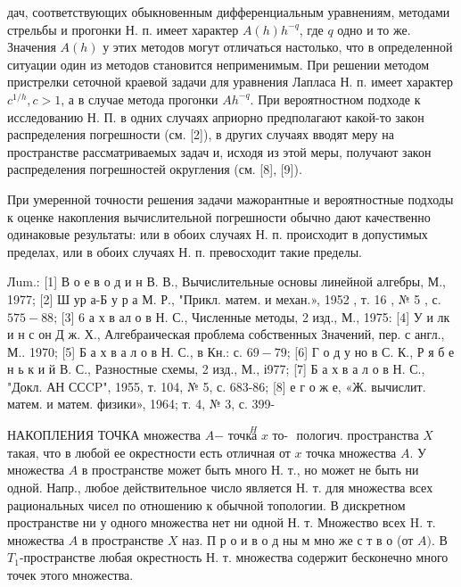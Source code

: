 \documentclass[10pt]{article}
\begin{document}
дач, соответствующих обыкновенным дифференциальным уравнениям, методами стрельбы и прогонки Н. п. имеет характер $A(h) h^{-q}$, где $q$ одно и то же. Значения $A(h)$ у этих методов могут отличаться настолько, что в определенной ситуации один из методов становится неприменимым. При решении методом пристрелки сеточной краевой задачи для уравнения Лапласа Н. п. имеет характер $c^{1 / h}, c>1$, а в случае метода прогонки $A h^{-q}$. При вероятностном подходе к исследованию Н. П. в одних случаях априорно предполагают какой-то закон распределения погрешности (см. [2]), в других случаях вводят меру на пространстве рассматриваемых задач и, исходя из этой меры, получают закон распределения погрешностей округления (см. [8], [9]).



При умеренной точности решения задачи мажорантные и вероятностные подходы к оценке накопления вычислительной погрешности обычно дают качественно одинаковые результаты: или в обоих случаях Н. п. происходит в допустимых пределах, или в обоих случаях Н. п. превосходит такие пределы.



Лum.: [1] В о е в о д и н В. В., Вычислительные основы линейной алгебры, М., 1977; [2] Ш ур а-Б у р а М. Р., "Прикл. матем. и механ.», 1952 , т. 16 , № 5 , с. $575-88$; [3] 6 а х в ал о в Н. С., Численные методы, 2 изд., М., 1975: [4] У и лк и н с он Д ж. Х., Алгебраическая проблема собственных Значений, пер. с англ., М.. 1970; [5] Б а х в а л о в Н. С., в Кн.: с. $69-79$; [6] Г о д у но в С. К., Р я б е н ь к и й В. С., Разностные схемы, 2 изд., М., і977; [7] Б а х в а л о в Н. С., "Докл. АН ССCP", 1955, т. 104, № 5, с. 683-86; [8] е г о ж е, «Ж. вычислит. матем. и матем. физики», 1964; т. 4, № 3, с. 399-



НАКОПЛЕНИЯ ТОЧКА множества $A \stackrel{H}{- \text { точка } x \text { то- }}$ пологич. пространства $X$ такая, что в любой ее окрестности есть отличная от $x$ точка множества $A$. У множества $A$ в пространстве может быть много Н. т., но может не быть ни одной. Напр., любое действительное число является Н. т. для множества всех рациональных чисел по отношению к обычной топологии. В дискретном пространстве ни у одного множества нет ни одной Н. т. Множество всех $\mathrm{H}$. т. множества $A$ в пространстве $X$ наз. П р о и в о д ны м мно же с т в о (от $A)$. В $T_{1}$-пространстве любая окрестность Н. т. множества содержит бесконечно много точек этого множества.
\end{document}
